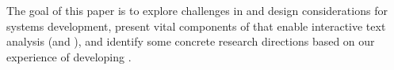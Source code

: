 



The goal of this paper is to explore challenges in and design considerations for \vita systems development,
present vital components of \system that enable interactive text analysis (\eg \vitaframe and \vta), and identify
some concrete research directions based on our experience of developing \system.


